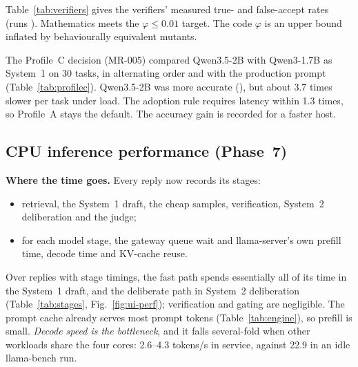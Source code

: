 Table~\ref{tab:verifiers} gives the verifiers' measured true- and false-accept rates (runs \RatesRuns).
Mathematics meets the $\varphi\le0.01$ target. The code $\varphi$ is an upper bound inflated by behaviourally
equivalent mutants.

\begin{table}[t]
\centering\caption{Policies on a mixed task set (run \PhaseTwoRun)}\label{tab:policies}
\resizebox{\columnwidth}{!}{\PhaseTwoTable}
\end{table}

\begin{table}[t]
\centering\caption{Verifier quality: $r$ from correct answers, $\varphi$ from seeded mutants}\label{tab:verifiers}
\resizebox{\columnwidth}{!}{\VerifierTable}
\end{table}

The Profile~C decision (MR-005) compared Qwen3.5-2B with Qwen3-1.7B as System~1 on 30 tasks, in alternating
order and with the production prompt (Table~\ref{tab:profilec}). Qwen3.5-2B was more accurate
(\ProfileCDelta), but about 3.7 times slower per task under load. The adoption rule requires latency within
1.3 times, so Profile~A stays the default. The accuracy gain is recorded for a faster host.

\begin{table}[t]
\centering\caption{Profile~C decision (System~1 candidates, 30 tasks)}\label{tab:profilec}
\resizebox{\columnwidth}{!}{\ProfileCTable}
\end{table}

\subsection{CPU inference performance (Phase~7)}
\label{sec:impl:perf}
\textbf{Where the time goes.} Every reply now records its stages:
\begin{itemize}
\item retrieval, the System~1 draft, the cheap samples, verification, System~2 deliberation and the judge;
\item for each model stage, the gateway queue wait and llama-server's own prefill time, decode time and
KV-cache reuse.
\end{itemize}
Over \StageReplies{} replies with stage timings, the fast path spends essentially all of its time in the System~1
draft, and the deliberate path in System~2 deliberation (Table~\ref{tab:stages}, Fig.~\ref{fig:ui-perf}); verification and gating are negligible. The prompt cache already serves most prompt tokens
(Table~\ref{tab:engine}), so prefill is small. \emph{Decode speed is the bottleneck}, and it falls several-fold
when other workloads share the four cores: 2.6--4.3 tokens/s in service, against 22.9 in an idle llama-bench run.

